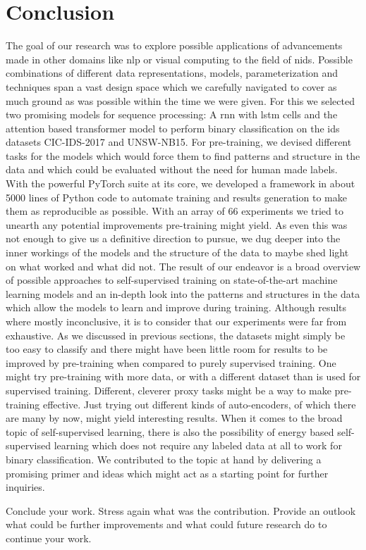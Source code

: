 \chapter{Conclusion} \label{sec:conclusion}

The goal of our research was to explore possible applications of advancements made in other domains like \gls{nlp} or visual computing to the field of \gls{nids}. Possible combinations of different data representations, models, parameterization and techniques span a vast design space which we carefully navigated to cover as much ground as was possible within the time we were given. For this we selected two promising models for sequence processing: A \gls{rnn} with \gls{lstm} cells and the attention based transformer model to perform binary classification on the \gls{ids} datasets CIC-IDS-2017 and UNSW-NB15. For pre-training, we devised different tasks for the models which would force them to find patterns and structure in the data and which could be evaluated without the need for human made labels. With the powerful PyTorch suite at its core, we developed a framework in about 5000 lines of Python code to automate training and results generation to make them as reproducible as possible. With an array of 66 experiments we tried to unearth any potential improvements pre-training might yield. As even this was not enough to give us a definitive direction to pursue, we dug deeper into the inner workings of the models and the structure of the data to maybe shed light on what worked and what did not. The result of our endeavor is a broad overview of possible approaches to self-supervised training on state-of-the-art machine learning models and an in-depth look into the patterns and structures in the data which allow the models to learn and improve during training. Although results where mostly inconclusive, it is to consider that our experiments were far from exhaustive. As we discussed in previous sections, the datasets might simply be too easy to classify and there might have been little room for results to be improved by pre-training when compared to purely supervised training. One might try pre-training with more data, or with a different dataset than is used for supervised training. Different, cleverer proxy tasks might be a way to make pre-training effective. Just trying out different kinds of auto-encoders, of which there are many by now, might yield interesting results. When it comes to the broad topic of self-supervised learning, there is also the possibility of energy based self-supervised learning which does not require any labeled data at all to work for binary classification.
We contributed to the topic at hand by delivering a promising primer and ideas which might act as a starting point for further inquiries. 

Conclude your work. Stress again what was the contribution. 
Provide an outlook what could be further improvements and what could future research do to continue your work.

\newpage